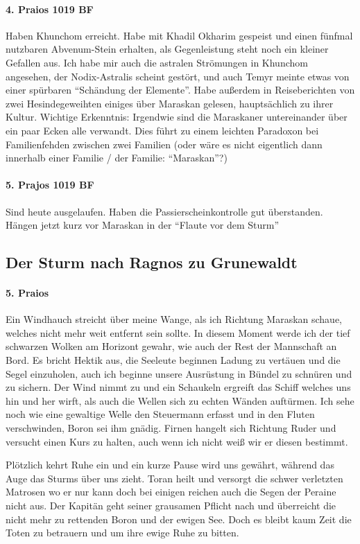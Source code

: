 \paragraph{4. Praios 1019 BF}
Haben Khunchom erreicht. Habe mit Khadil Okharim gespeist und einen fünfmal nutzbaren Abvenum-Stein erhalten, als Gegenleistung steht noch ein kleiner Gefallen aus.
Ich habe mir auch die astralen Strömungen in Khunchom angesehen, der Nodix-Astralis scheint gestört, und auch Temyr meinte etwas von einer spürbaren ``Schändung der Elemente''.
Habe außerdem in Reiseberichten von zwei Hesindegeweihten einiges über Maraskan gelesen, hauptsächlich zu ihrer Kultur. Wichtige Erkenntnis: Irgendwie sind die Maraskaner untereinander über ein paar Ecken alle verwandt. Dies führt zu einem leichten Paradoxon bei Familienfehden zwischen zwei Familien (oder wäre es nicht eigentlich dann innerhalb einer Familie / der Familie: ``Maraskan''?)

\paragraph{5. Prajos 1019 BF}
Sind heute ausgelaufen. Haben die Passierscheinkontrolle gut überstanden. Hängen jetzt kurz vor Maraskan in der ``Flaute vor dem Sturm''

\subsection{Der Sturm nach Ragnos zu Grunewaldt}

\paragraph{5. Praios}
Ein Windhauch streicht über meine Wange, als ich Richtung Maraskan schaue, welches nicht mehr weit entfernt sein sollte. In diesem Moment werde ich der tief schwarzen Wolken am Horizont gewahr, wie auch der Rest der Mannschaft an Bord. Es bricht Hektik aus, die Seeleute beginnen Ladung zu vertäuen und die Segel einzuholen, auch ich beginne unsere Ausrüstung in Bündel zu schnüren und zu sichern. Der Wind nimmt zu und ein Schaukeln ergreift das Schiff welches uns hin und her wirft, als auch die Wellen sich zu echten Wänden auftürmen. Ich sehe noch wie eine gewaltige Welle den Steuermann erfasst und in den Fluten verschwinden, Boron sei ihm gnädig. Firnen hangelt sich Richtung Ruder und versucht einen Kurs zu halten, auch wenn ich nicht weiß wir er diesen bestimmt. 

Plötzlich kehrt Ruhe ein und ein kurze Pause wird uns gewährt, während das Auge das Sturms über uns zieht. Toran heilt und versorgt die schwer verletzten Matrosen wo er nur kann doch bei einigen reichen auch die Segen der Peraine nicht aus. Der Kapitän geht seiner grausamen Pflicht nach und überreicht die nicht mehr zu rettenden Boron und der ewigen See. Doch es bleibt kaum Zeit die Toten zu betrauern und um ihre ewige Ruhe zu bitten. 

